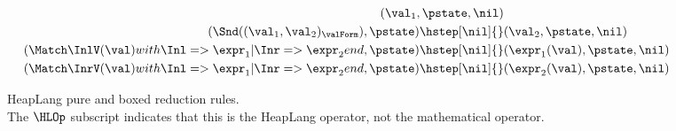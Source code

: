 \begin{figure}[p]
\begin{align*}
  (\val_1, \pstate, \nil) \\
(\Snd((\val_1, \val_2)_\valForm), \pstate) \hstep[\nil]{}&
  (\val_2, \pstate, \nil) \\
(\Match \InlV(\val) with \Inl => \expr_1 | \Inr => \expr_2 end, \pstate) \hstep[\nil]{}&
  (\expr_1(\val), \pstate, \nil) \\
(\Match \InrV(\val) with \Inl => \expr_1 | \Inr => \expr_2 end, \pstate) \hstep[\nil]{}&
  (\expr_2(\val), \pstate, \nil)
\end{align*}
\caption{HeapLang pure and boxed reduction rules. \\ \small
The $\HLOp$ subscript indicates that this is the HeapLang operator, not the mathematical operator.}
\label{fig:heaplang-reduction-pure}
\end{figure}

